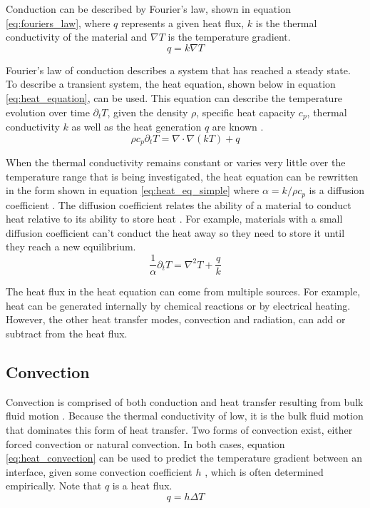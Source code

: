 Conduction can be described by Fourier's law, shown in equation \ref{eq:fouriers_law}, where $q$ represents a given heat flux, $k$ is the thermal conductivity of the material and $\nabla T$ is the temperature gradient. 
\begin{equation}
	q = k \nabla T
	\label{eq:fouriers_law}
\end{equation}

Fourier's law of conduction describes a system that has reached a steady state. To describe a transient system, the heat equation, shown below in equation \ref{eq:heat_equation}, can be used. This equation can describe the temperature evolution over time $\partial_tT$, given the density $\rho$, specific heat capacity $c_p$, thermal conductivity $k$ as well as the heat generation $q$ are known \cite{Bergman_2011}.
\begin{equation}
	\rho c_p \partial_tT=\nabla\cdot\nabla (kT) + q
	\label{eq:heat_equation}
\end{equation}

When the thermal conductivity remains constant or varies very little over the temperature range that is being investigated, the heat equation can be rewritten in the form shown in equation \ref{eq:heat_eq_simple} where $\alpha=k/\rho c_p$ is a diffusion coefficient \cite{Bergman_2011}. The diffusion coefficient relates the ability of a material to conduct heat relative to its ability to store heat \cite{Bergman_2011}. For example, materials with a small diffusion coefficient can't conduct the heat away so they need to store it until they reach a new equilibrium.
\begin{equation}
	\frac{1}{\alpha}\partial_tT=\nabla^2T + \frac{q}{k}
	\label{eq:heat_eq_simple}
\end{equation}

The heat flux in the heat equation can come from multiple sources. For example, heat can be generated internally by chemical reactions or by electrical heating. However, the other heat transfer modes, convection and radiation, can add or subtract from the heat flux. 

\subsection*{Convection}
Convection is comprised of both conduction and heat transfer resulting from bulk fluid motion \cite{Bergman_2011}. Because the thermal conductivity of low, it is the bulk fluid motion that dominates this form of heat transfer. Two forms of convection exist, either forced convection or natural convection. In both cases, equation \ref{eq:heat_convection} can be used to predict the temperature gradient between an interface, given some convection coefficient $h$ \cite{Bergman_2011}, which is often determined empirically. Note that $q$ is a heat flux.
\begin{equation}
	q = h\Delta T
	\label{eq:heat_convection}
\end{equation}

